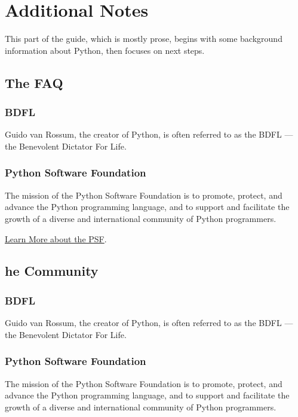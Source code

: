\documentclass[letterpaper,10pt,english]{sphinxmanual}
\begin{document}
\chapter{Additional Notes}
\label{\detokenize{index:additional-notes}}
This part of the guide, which is mostly prose, begins with some
background information about Python, then focuses on next steps.


\section{The FAQ}
\label{\detokenize{support/faq::doc}}\label{\detokenize{support/faq:the-faq}}

\subsection{BDFL}
\label{\detokenize{support/faq:bdfl}}
Guido van Rossum, the creator of Python, is often referred to as the BDFL — the
Benevolent Dictator For Life.


\subsection{Python Software Foundation}
\label{\detokenize{support/faq:python-software-foundation}}
The mission of the Python Software Foundation is to promote, protect, and
advance the Python programming language, and to support and facilitate the
growth of a diverse and international community of Python programmers.

\href{http://www.python.org/psf/}{Learn More about the PSF}.


\section{he Community}
\label{\detokenize{support/error::doc}}\label{\detokenize{support/error:he-community}}

\subsection{BDFL}
\label{\detokenize{support/error:bdfl}}
Guido van Rossum, the creator of Python, is often referred to as the BDFL — the
Benevolent Dictator For Life.


\subsection{Python Software Foundation}
\label{\detokenize{support/error:python-software-foundation}}
The mission of the Python Software Foundation is to promote, protect, and
advance the Python programming language, and to support and facilitate the
growth of a diverse and international community of Python programmers.
\end{document}
